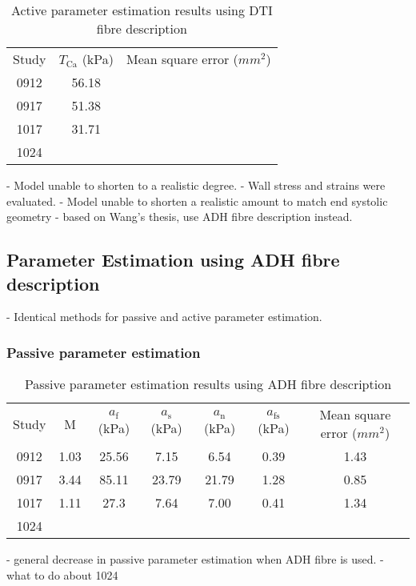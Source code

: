 \documentclass{llncs}
\begin{document}
\begin{table}[H]
	\caption{Active parameter estimation results using DTI fibre description}
	\begin{center}
		\renewcommand{\arraystretch}{1.2}
		\setlength\tabcolsep{8pt}
		\begin{tabular}{ccc}
		\hline\noalign{\smallskip}
		Study & $T_{\mathrm{Ca}}$ (kPa) & Mean square error ($mm^{2}$)\\
		\noalign{\smallskip}
		\hline
		\noalign{\smallskip}
		0912 & 56.18 &  \\
		\noaling{\smallskip}
		0917 & 51.38 &  \\ 
		\noaling{\smallskip}
		1017 & 31.71 &  \\ 
		\noaling{\smallskip}
		1024 &  & \\ 
		\hline
		\end{tabular}
	\end{center}
\end{table}

- Model unable to shorten to a realistic degree. 
- Wall stress and strains were evaluated. 
- Model unable to shorten a realistic amount to match end systolic geometry - based on Wang's thesis, use ADH fibre description instead.  

\subsection {Parameter Estimation using ADH fibre description}
- Identical methods for passive and active parameter estimation. 
\subsubsection{Passive parameter estimation}
\begin{table}[H]
	\caption{Passive parameter estimation results using ADH fibre description}
	\begin{center}
		\renewcommand{\arraystretch}{1.2}
		\setlength\tabcolsep{8pt}
		\begin{tabular}{ccccccc}
		\hline\noalign{\smallskip}
		Study & M & $a_{\mathrm{f}}$ (kPa) & $a_{\mathrm{s}}$ (kPa) & $a_{\mathrm{n}}$ (kPa) & $a_{\mathrm{fs}}$ (kPa) & Mean square error ($mm^{2}$)\\
		\noalign{\smallskip}
		\hline
		\noalign{\smallskip}
		0912 & 1.03 & 25.56 & 7.15 & 6.54 & 0.39 & 1.43 \\
		\noaling{\smallskip}
		0917 & 3.44 & 85.11 & 23.79 & 21.79 & 1.28 & 0.85 \\ 
		\noaling{\smallskip}
		1017 & 1.11 & 27.3 & 7.64 & 7.00 & 0.41 & 1.34 \\ 
		\noaling{\smallskip}
		1024 &  & & & & & \\ 
		\hline
		\end{tabular}
	\end{center}
\end{table}
- general decrease in passive parameter estimation when ADH fibre is used. 
- what to do about 1024
\end{document}
